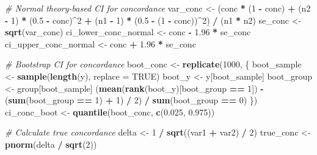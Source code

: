 \documentclass[
  letterpaper,
  DIV=11,
  numbers=noendperiod]{scrartcl}
\newenvironment{Shaded}{\begin{snugshade}}{\end{snugshade}}
\newcommand{\AttributeTok}[1]{\textcolor[rgb]{0.13,0.29,0.53}{#1}}
\newcommand{\CommentTok}[1]{\textcolor[rgb]{0.56,0.35,0.01}{\textit{#1}}}
\newcommand{\ConstantTok}[1]{\textcolor[rgb]{0.56,0.35,0.01}{#1}}
\newcommand{\DecValTok}[1]{\textcolor[rgb]{0.00,0.00,0.81}{#1}}
\newcommand{\FloatTok}[1]{\textcolor[rgb]{0.00,0.00,0.81}{#1}}
\newcommand{\FunctionTok}[1]{\textcolor[rgb]{0.13,0.29,0.53}{\textbf{#1}}}
\newcommand{\NormalTok}[1]{#1}
\newcommand{\OtherTok}[1]{\textcolor[rgb]{0.56,0.35,0.01}{#1}}
\newcommand{\SpecialCharTok}[1]{\textcolor[rgb]{0.81,0.36,0.00}{\textbf{#1}}}
\begin{document}
\begin{Shaded}
\begin{Highlighting}[]
      \CommentTok{\# Normal theory{-}based CI for concordance}
\NormalTok{      var\_conc }\OtherTok{\textless{}{-}}\NormalTok{ (conc }\SpecialCharTok{*}\NormalTok{ (}\DecValTok{1} \SpecialCharTok{{-}}\NormalTok{ conc) }\SpecialCharTok{+}\NormalTok{ (n2 }\SpecialCharTok{{-}} \DecValTok{1}\NormalTok{) }\SpecialCharTok{*}\NormalTok{ (}\FloatTok{0.5} \SpecialCharTok{{-}}\NormalTok{ conc)}\SpecialCharTok{\^{}}\DecValTok{2} \SpecialCharTok{+}\NormalTok{ (n1 }\SpecialCharTok{{-}} \DecValTok{1}\NormalTok{) }\SpecialCharTok{*}\NormalTok{ (}\FloatTok{0.5} \SpecialCharTok{{-}}\NormalTok{ (}\DecValTok{1} \SpecialCharTok{{-}}\NormalTok{ conc))}\SpecialCharTok{\^{}}\DecValTok{2}\NormalTok{) }\SpecialCharTok{/}\NormalTok{ (n1 }\SpecialCharTok{*}\NormalTok{ n2)}
\NormalTok{      se\_conc }\OtherTok{\textless{}{-}} \FunctionTok{sqrt}\NormalTok{(var\_conc)}
\NormalTok{      ci\_lower\_conc\_normal }\OtherTok{\textless{}{-}}\NormalTok{ conc }\SpecialCharTok{{-}} \FloatTok{1.96} \SpecialCharTok{*}\NormalTok{ se\_conc}
\NormalTok{      ci\_upper\_conc\_normal }\OtherTok{\textless{}{-}}\NormalTok{ conc }\SpecialCharTok{+} \FloatTok{1.96} \SpecialCharTok{*}\NormalTok{ se\_conc}
      
      \CommentTok{\# Bootstrap CI for concordance}
\NormalTok{      boot\_conc }\OtherTok{\textless{}{-}} \FunctionTok{replicate}\NormalTok{(}\DecValTok{1000}\NormalTok{, \{}
\NormalTok{        boot\_sample }\OtherTok{\textless{}{-}} \FunctionTok{sample}\NormalTok{(}\FunctionTok{length}\NormalTok{(y), }\AttributeTok{replace =} \ConstantTok{TRUE}\NormalTok{)}
\NormalTok{        boot\_y }\OtherTok{\textless{}{-}}\NormalTok{ y[boot\_sample]}
\NormalTok{        boot\_group }\OtherTok{\textless{}{-}}\NormalTok{ group[boot\_sample]}
\NormalTok{        (}\FunctionTok{mean}\NormalTok{(}\FunctionTok{rank}\NormalTok{(boot\_y)[boot\_group }\SpecialCharTok{==} \DecValTok{1}\NormalTok{]) }\SpecialCharTok{{-}}\NormalTok{ (}\FunctionTok{sum}\NormalTok{(boot\_group }\SpecialCharTok{==} \DecValTok{1}\NormalTok{) }\SpecialCharTok{+} \DecValTok{1}\NormalTok{) }\SpecialCharTok{/} \DecValTok{2}\NormalTok{) }\SpecialCharTok{/} \FunctionTok{sum}\NormalTok{(boot\_group }\SpecialCharTok{==} \DecValTok{0}\NormalTok{)}
\NormalTok{      \})}
\NormalTok{      ci\_conc\_boot }\OtherTok{\textless{}{-}} \FunctionTok{quantile}\NormalTok{(boot\_conc, }\FunctionTok{c}\NormalTok{(}\FloatTok{0.025}\NormalTok{, }\FloatTok{0.975}\NormalTok{))}
      
      \CommentTok{\# Calculate true concordance}
\NormalTok{      delta }\OtherTok{\textless{}{-}} \DecValTok{1} \SpecialCharTok{/} \FunctionTok{sqrt}\NormalTok{((var1 }\SpecialCharTok{+}\NormalTok{ var2) }\SpecialCharTok{/} \DecValTok{2}\NormalTok{)}
\NormalTok{      true\_conc }\OtherTok{\textless{}{-}} \FunctionTok{pnorm}\NormalTok{(delta }\SpecialCharTok{/} \FunctionTok{sqrt}\NormalTok{(}\DecValTok{2}\NormalTok{))}
      

\end{Highlighting}
\end{Shaded}
\end{document}
